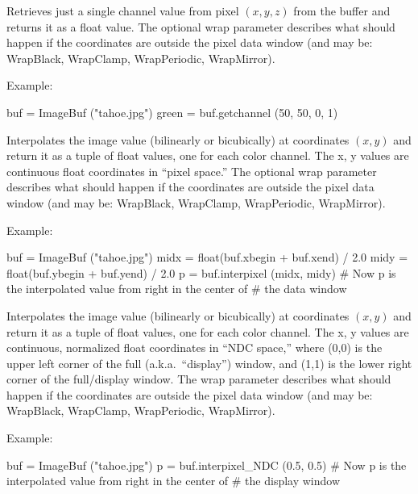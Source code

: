 Retrieves just a single channel value from pixel $(x,y,z)$ from the buffer
and returns it as a {\cf float} value.  The optional {\cf wrap} parameter
describes what should happen if the coordinates are outside the pixel data
window (and may be: {\cf WrapBlack, WrapClamp, WrapPeriodic, WrapMirror}).

\noindent Example:
\begin{code}
    buf = ImageBuf ("tahoe.jpg")
    green = buf.getchannel (50, 50, 0, 1)
\end{code}
\apiend

Interpolates the image value (bilinearly or bicubically)
at coordinates $(x,y)$ and return it as a tuple
of {\cf float} values, one for each color channel.  The {\cf x, y} values
are continuous {\cf float} coordinates in ``pixel space.''   The optional
{\cf wrap} parameter describes what should happen if the coordinates are
outside the pixel data window (and may be: {\cf WrapBlack, WrapClamp,
WrapPeriodic, WrapMirror}).

\noindent Example:
\begin{code}
    buf = ImageBuf ("tahoe.jpg")
    midx = float(buf.xbegin + buf.xend) / 2.0
    midy = float(buf.ybegin + buf.yend) / 2.0
    p = buf.interpixel (midx, midy)
    # Now p is the interpolated value from right in the center of
    # the data window
\end{code}
\apiend


Interpolates the image value (bilinearly or bicubically)
at coordinates $(x,y)$ and return it as a tuple
of {\cf float} values, one for each color channel.  The {\cf x, y} values
are continuous, normalized {\cf float} coordinates in ``NDC space,'' where
{\cf (0,0)} is the upper left corner of the full (a.k.a.\ ``display'')
window, and {\cf (1,1)} is the lower right corner of the full/display
window. The  {\cf wrap} parameter describes what should happen if the
coordinates are outside the pixel data window (and may be: {\cf WrapBlack,
WrapClamp, WrapPeriodic, WrapMirror}).

\noindent Example:
\begin{code}
    buf = ImageBuf ("tahoe.jpg")
    p = buf.interpixel_NDC (0.5, 0.5)
    # Now p is the interpolated value from right in the center of
    # the display window
\end{code}
\apiend


